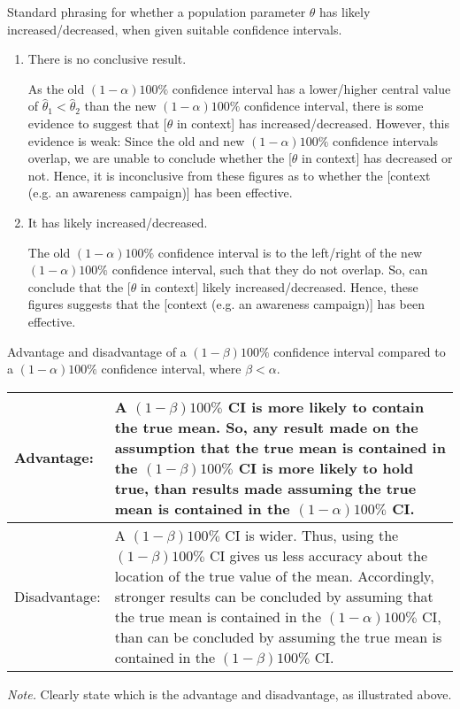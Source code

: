 \begin{note}
  Standard phrasing for whether a population parameter \(\theta\) has likely increased/decreased, when given suitable confidence intervals.
  \begin{enumerate}
    \item There is no conclusive result.

    As the old \((1-\alpha)100\%\) confidence interval has a lower/higher central value of \(\widehat{\theta}_1<\widehat{\theta}_2\) than the new \((1-\alpha)100\%\) confidence interval, there is some evidence to suggest that [\(\theta\) in context] has increased/decreased. However, this evidence is weak: Since the old and new \((1-\alpha)100\%\) confidence intervals overlap, we are unable to conclude whether the [\(\theta\) in context] has decreased or not. Hence, it is inconclusive from these figures as to whether the [context (e.g. an awareness campaign)] has been effective.
    \item It has likely increased/decreased.
    
    The old \((1-\alpha)100\%\) confidence interval is to the left/right of the new \((1-\alpha)100\%\) confidence interval, such that they do not overlap. So, can conclude that the [\(\theta\) in context] likely increased/decreased. Hence, these figures suggests that the [context (e.g. an awareness campaign)] has been effective.
  \end{enumerate}
\end{note}
\begin{note}
  Advantage and disadvantage of a \((1-\beta)100\%\) confidence interval compared to a \((1-\alpha)100\%\) confidence interval, where \(\beta<\alpha\).
  \begin{center}
    \begin{tabular}{m{}m{}}
      \toprule
      Advantage:& A \((1-\beta)100\%\) CI is more likely to contain the true mean. So, any result made on the assumption that the true mean is contained in the \((1-\beta)100\%\) CI is more likely to hold true, than results made assuming the true mean is contained in the \((1-\alpha)100\%\) CI.\\
      \midrule
      Disadvantage:& A \((1-\beta)100\%\) CI is wider. Thus, using the \((1-\beta)100\%\) CI gives us less accuracy about the location of the true value of the mean. Accordingly, stronger results can be concluded by assuming that the true mean is contained in the \((1-\alpha)100\%\) CI, than can be concluded by assuming the true mean is contained in the \((1-\beta)100\%\) CI.\\
      \bottomrule
    \end{tabular}
  \end{center}
  \emph{Note.} Clearly state which is the advantage and disadvantage, as illustrated above.
\end{note}
